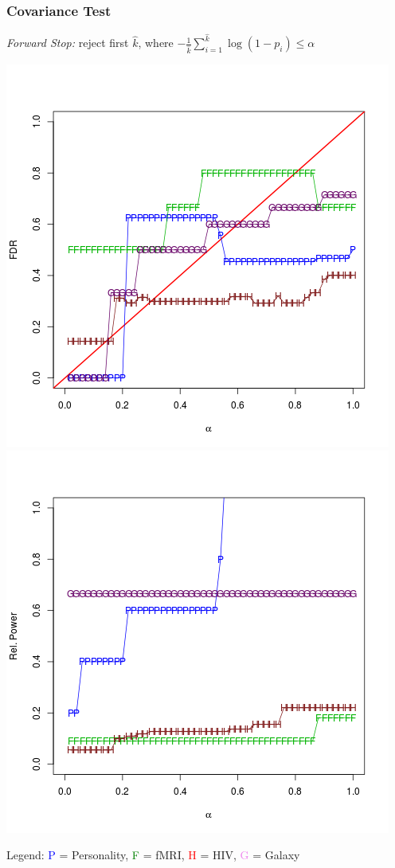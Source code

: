 \documentclass{beamer}
\begin{document}
\begin{frame}
\frametitle{Covariance Test}
\emph{Forward Stop:} reject first $\hat{k}$, where $-\frac{1}{\hat{k}}\sum_{i=1}^{\hat{k}} \log(1-p_i) \leq \alpha$

\begin{center}
\includegraphics[scale = 0.3]{res_c_fs_type1.png}
\includegraphics[scale = 0.3]{res_c_fs_power.png}
\end{center}

Legend: \textcolor{blue}{P} = Personality, \textcolor{green}{F} = fMRI,
\textcolor{red}{H} = HIV, \textcolor{violet}{G} = Galaxy
\end{frame}
\end{document}

